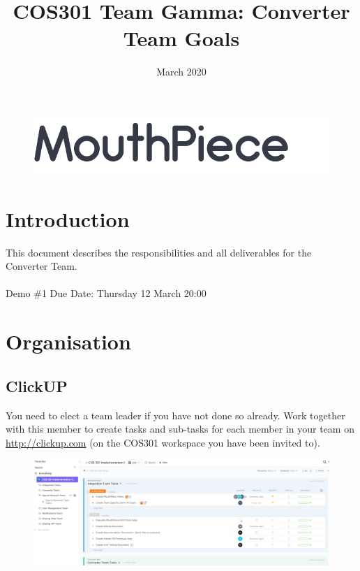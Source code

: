\documentclass{article}
\begin{document}
\title{COS301 Team Gamma: Converter Team Goals}
\begin{figure}
    \centering
    \includegraphics[width=\textwidth]{logo.png}
\end{figure}
\date{March 2020}

\maketitle

\section{Introduction}
This document describes the responsibilities and all deliverables for the \\ Converter Team.
\\ \\
Demo \#1 Due Date: Thursday 12 March 20:00
\newpage

\section{Organisation}
\subsection{ClickUP}
You need to elect a team leader if you have not done so already. Work together with this member to create tasks and sub-tasks for each member in your team on \url{http://clickup.com} (on the COS301 workspace you have been invited to). \\

\begin{figure}[h]
    \centering
    \includegraphics[width=\textwidth]{clickup.png}
\end{figure}
\end{document}
